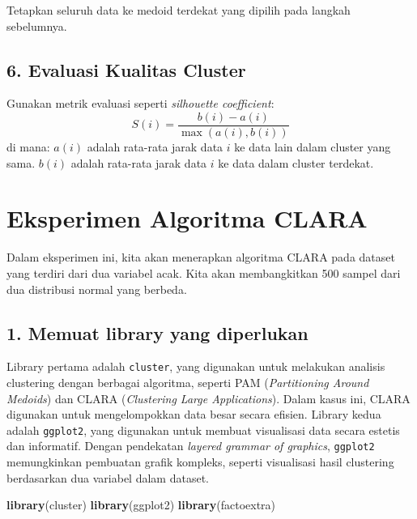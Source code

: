 \documentclass[
  oneside]{book}
\newenvironment{Shaded}{\begin{snugshade}}{\end{snugshade}}
\newcommand{\FunctionTok}[1]{\textcolor[rgb]{0.13,0.29,0.53}{\textbf{#1}}}
\newcommand{\NormalTok}[1]{#1}
\begin{document}
Tetapkan seluruh data ke medoid terdekat yang dipilih pada langkah sebelumnya.

\subsection*{6. Evaluasi Kualitas Cluster}\label{evaluasi-kualitas-cluster}

Gunakan metrik evaluasi seperti \emph{silhouette coefficient}:
\[
  S(i) = \frac{b(i) - a(i)}{\max(a(i), b(i))}
  \]
di mana: \(a(i)\) adalah rata-rata jarak data \(i\) ke data lain dalam cluster yang sama. \(b(i)\) adalah rata-rata jarak data \(i\) ke data dalam cluster terdekat.

\section{Eksperimen Algoritma CLARA}\label{eksperimen-algoritma-clara}

Dalam eksperimen ini, kita akan menerapkan algoritma CLARA pada dataset yang terdiri dari dua variabel acak. Kita akan membangkitkan 500 sampel dari dua distribusi normal yang berbeda.

\subsection*{1. Memuat library yang diperlukan}\label{memuat-library-yang-diperlukan}

Library pertama adalah \texttt{cluster}, yang digunakan untuk melakukan analisis clustering dengan berbagai algoritma, seperti PAM (\emph{Partitioning Around Medoids}) dan CLARA (\emph{Clustering Large Applications}). Dalam kasus ini, CLARA digunakan untuk mengelompokkan data besar secara efisien. Library kedua adalah \texttt{ggplot2}, yang digunakan untuk membuat visualisasi data secara estetis dan informatif. Dengan pendekatan \emph{layered grammar of graphics}, \texttt{ggplot2} memungkinkan pembuatan grafik kompleks, seperti visualisasi hasil clustering berdasarkan dua variabel dalam dataset.

\begin{Shaded}
\begin{Highlighting}[]
\FunctionTok{library}\NormalTok{(cluster)}
\FunctionTok{library}\NormalTok{(ggplot2)}
\FunctionTok{library}\NormalTok{(factoextra)}
\end{Highlighting}
\end{Shaded}
\end{document}
